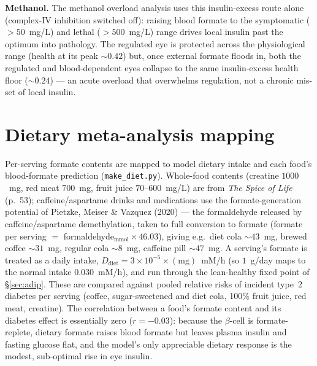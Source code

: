 \documentclass[11pt]{article}
\begin{document}
\textbf{Methanol.} The methanol overload analysis uses this insulin-excess route
alone (complex-IV inhibition switched off): raising blood formate to the
symptomatic ($>50$~mg/L) and lethal ($>500$~mg/L) range drives local insulin past
the optimum into pathology. The regulated eye is protected across the physiological
range (health at its peak $\sim0.42$) but, once external formate floods in, both
the regulated and blood-dependent eyes collapse to the same insulin-excess health
floor ($\sim0.24$) --- an acute overload that overwhelms regulation, not a chronic
mis-set of local insulin.

\section{Dietary meta-analysis mapping}\label{sec:diet}

Per-serving formate contents are mapped to model dietary intake and each food's
blood-formate prediction (\texttt{make\_diet.py}). Whole-food contents (creatine
$1000$~mg, red meat $700$~mg, fruit juice $70$--$600$~mg/L) are from
\textit{The Spice of Life} (p.~53); caffeine/aspartame drinks and medications use
the formate-generation potential of Pietzke, Meiser \& Vazquez (2020) ---
the formaldehyde released by caffeine/aspartame demethylation, taken to full
conversion to formate (formate per serving $=$ formaldehyde$_{\mathrm{mmol}}\times
46.03$), giving e.g.\ diet cola ${\sim}43$~mg, brewed coffee ${\sim}31$~mg, regular
cola ${\sim}8$~mg, caffeine pill ${\sim}47$~mg. A serving's formate is treated as a
daily intake, $D_{\mathrm{diet}}=3\times10^{-5}\times(\text{mg})$~mM/h (so
$1$~g/day maps to the normal intake $0.030$~mM/h), and run through the lean-healthy
fixed point of \S\ref{sec:adip}. These are compared against pooled relative risks
of incident type~2 diabetes per serving (coffee, sugar-sweetened and diet cola,
100\% fruit juice, red meat, creatine). The correlation between a food's formate
content and its diabetes effect is essentially zero ($r=-0.03$): because the
$\beta$-cell is formate-replete, dietary formate raises blood formate but leaves
plasma insulin and fasting glucose flat, and the model's only appreciable dietary
response is the modest, sub-optimal rise in eye insulin.

\end{document}
